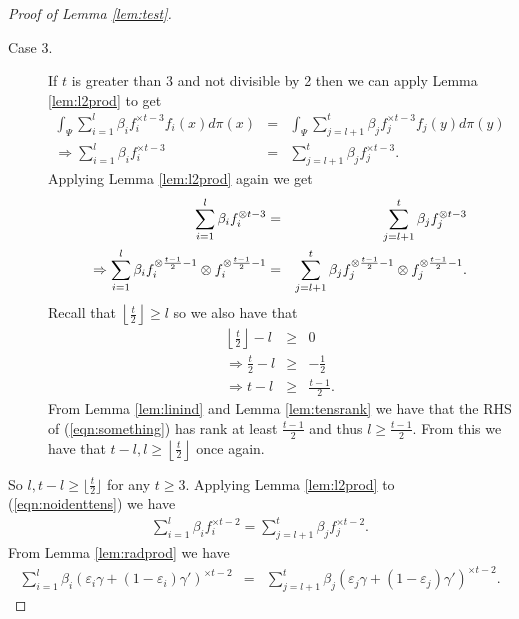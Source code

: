 \documentclass[aos,preprint]{imsart}
\def\l{\left}
\def\r{\right}
\theoremstyle{plain}
\theoremstyle{defintion}
\begin{document}
\begin{proof}[Proof of Lemma \ref{lem:test}]
\begin{description}
                    \item[Case 3.] If $t$ is greater than 3 and not divisible by 2 then we can apply Lemma \ref{lem:l2prod} to get
                        \begin{eqnarray*}
                            \int_\Psi \sum_{i=1}^l \beta_i f_i^{\times t-3}f_i(x) d\pi(x) &=& \int_\Psi \sum_{j=l+1}^{t}\beta_j f_j^{\times t-3} f_j(y) d\pi(y)\\
                            \Rightarrow  \sum_{i=1}^l \beta_i f_i^{\times t-3} &=&  \sum_{j=l+1}^{t}\beta_j f_j^{\times t-3}.
                        \end{eqnarray*}
                        Applying Lemma \ref{lem:l2prod} again we get
                        \begin{eqnarray} 
                            \notag \sum_{i=1}^l \beta_i f_i^{\otimes t-3 } &=&  \sum_{j=l+1}^{t}\beta_j f_j^{\otimes t-3 } \\
                            \Rightarrow\sum_{i=1}^l \beta_i f_i^{\otimes \frac{t-1}{2} -1 } \otimes f_i^{\otimes \frac{t-1}{2} -1 } &=&  \sum_{j=l+1}^{t}\beta_j f_j^{\otimes \frac{t-1}{2} -1 } \otimes f_j^{\otimes \frac{t-1}{2} -1 }.\label{eqn:something}
                        \end{eqnarray}
		Recall that $\l\lfloor \frac{t}{2} \r\rfloor \ge l$ so we also have that
		\begin{eqnarray*}
			\l\lfloor \frac{t}{2}\r\rfloor - l &\ge& 0 \\
			\Rightarrow \frac{t}{2} - l &\ge& -\frac{1}{2}\\
			\Rightarrow t-l &\ge& \frac{t-1}{2}.
		\end{eqnarray*}
		From Lemma \ref{lem:linind} and Lemma \ref{lem:tensrank} we have that the RHS of (\ref{eqn:something}) has rank at least $\frac{t-1}{2}$ and thus $l\ge \frac{t-1}{2}$. From this we have that $t-l,l\ge \l\lfloor \frac{t}{2}\r\rfloor$ once again.
                \end{description}
                So $l,t-l \ge \lfloor \frac{t}{2}\rfloor$ for any $t\ge 3$. Applying Lemma \ref{lem:l2prod} to (\ref{eqn:noidenttens}) we have 
		\begin{eqnarray*}
			\sum_{i=1}^l \beta_i f_i^{\times t-2} = \sum_{j=l+1}^{t}\beta_j f_j^{\times t-2}.
		\end{eqnarray*}
		From Lemma \ref{lem:radprod} we have
		\begin{eqnarray*}
			\sum_{i=1}^l  \beta_i \left( \varepsilon_i \gamma + \left( 1-\varepsilon_i \right) \gamma' \right)^{\times t-2}   &=& \sum_{j=l+1}^{t} \beta_j \left( \varepsilon_j \gamma + \left( 1-\varepsilon_j \right) \gamma' \right)^{\times t-2}.
		\end{eqnarray*}
	\end{proof}
\end{document}
